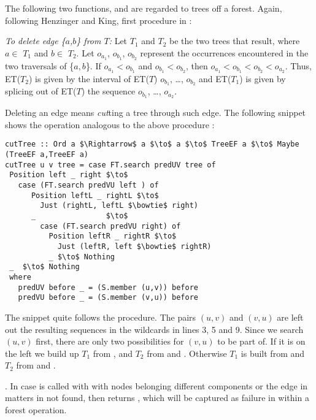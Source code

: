 The following two functions,  and  are regarded to trees off a forest. Again, following Henzinger and King, first procedure in \cite{Rand-DynGs-Algos}:
\begin{displayquote}
\emph{To delete edge \{$a$,$b$\} from $T$:} Let $T_1$ and $T_2$ be the two trees that result, where $a \in$ $T_1$ and $b \in$ $T_2$. Let $o_{a_1}$, $o_{b_1}$, $o_{b_2}$ represent the occurrences encountered in the two traversals of \{$a,b$\}. If $o_{a_1} < o_{b_1}$ and $o_{b_1} < o_{b_2}$, then $o_{a_1} < o_{b_1} < o_{b_2} < o_{a_2}$. Thus, ET($T_2$) is given by the interval of ET($T$) $o_{b_1}$, \ldots, $o_{b_2}$ and ET($T_1$) is given by splicing out of ET($T$) the sequence $o_{b_1}$, \ldots, $o_{a_2}$. 
\end{displayquote} 

Deleting an edge means \emph{cut}ting a tree through such edge. The following snippet shows the  operation analogous to the above procedure :
\begin{lstlisting}[mathescape]
cutTree :: Ord a $\Rightarrow$ a $\to$ a $\to$ TreeEF a $\to$ Maybe (TreeEF a,TreeEF a) 
cutTree u v tree = case FT.search predUV tree of
 Position left _ right $\to$
   case (FT.search predVU left ) of
      Position leftL _ rightL $\to$  
        Just (rightL, leftL $\bowtie$ right)
      _                $\to$                    
        case (FT.search predVU right) of
          Position leftR _ rightR $\to$
            Just (leftR, left $\bowtie$ rightR)
          _ $\to$ Nothing 
 _  $\to$ Nothing  
 where
   predUV before _ = (S.member (u,v)) before 
   predVU before _ = (S.member (v,u)) before 
\end{lstlisting}

The snippet quite follows the procedure. The pairs $(u,v)$ and $(v,u)$ are left out the resulting sequences in the wildcards in lines 3, 5 and 9. Since we search $(u,v)$ first, there are only two possibilities for $(v,u)$ to be part of. If it is on the left we build up $T_1$ from , and $T_2$ from  and . Otherwise $T_1$ is built from  and $T_2$ from  and .

. In case  is called with with nodes belonging different components or the edge in matters in not found, then  returns , which will be captured as failure in \cut within a forest operation.


